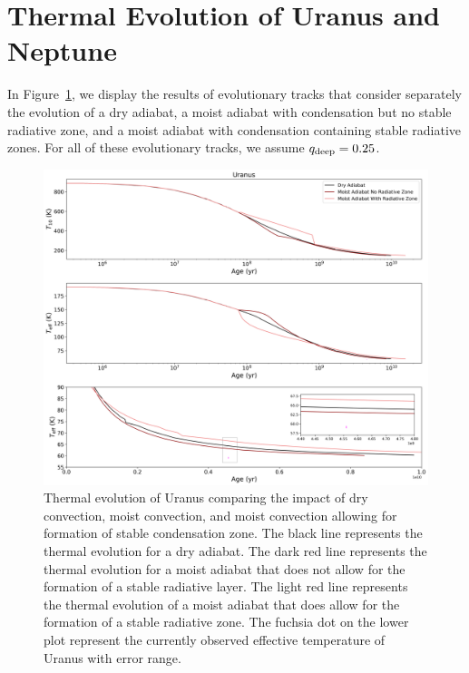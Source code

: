 \documentclass[11pt]{ucscthesisbs}
\begin{document}
\section{Thermal Evolution of Uranus and Neptune}

In Figure~\ref{fig:evolve_adiabats}, we display the results of evolutionary tracks that consider separately the evolution of a dry adiabat, a moist adiabat with condensation but no stable radiative zone, and a moist adiabat with condensation containing stable radiative zones. For all of these evolutionary tracks, we assume $q_{\rm deep} = 0.25$. 
\begin{figure}[ht]
 \centerline{
  \includegraphics[width=\columnwidth]{figures/dry_moist_radiative_u_cooling_curves_adiabat_comparisons.png}
 }
\caption[Thermal Evolution Curves for Uranus - Adiabat Comparisons]
{Thermal evolution of Uranus comparing the impact of dry convection, moist convection, and moist convection allowing for formation of stable condensation zone. The black line represents the thermal evolution for a dry adiabat. The dark red line represents the thermal evolution for a moist adiabat that does not allow for the formation of a stable radiative layer. The light red line represents the thermal evolution of a moist adiabat that does allow for the formation of a stable radiative zone. The fuchsia dot on the lower plot represent the currently observed effective temperature of Uranus with error range. }
\label{fig:evolve_adiabats}
\end{figure}
\end{document}
